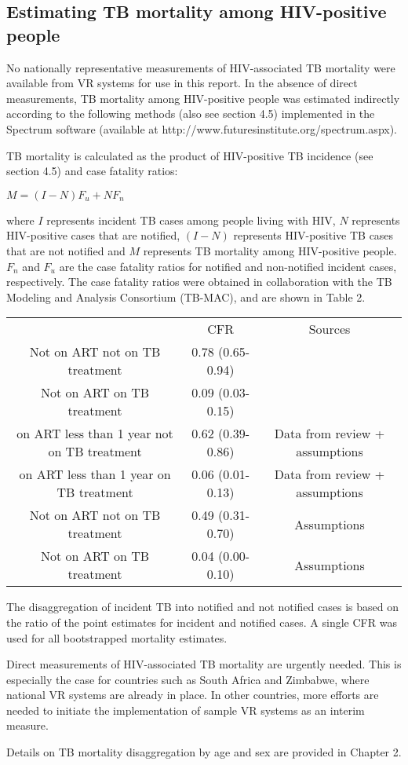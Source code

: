 \subsection{Estimating TB mortality among HIV-positive people}

No nationally representative measurements of HIV-associated TB mortality were available from VR systems for use in this report. In the absence of direct measurements, TB mortality among HIV-positive people was estimated indirectly according to the following methods (also see section 4.5) implemented in the Spectrum software (available at http://www.futuresinstitute.org/spectrum.aspx).

TB mortality is calculated as the product of HIV-positive TB incidence (see section 4.5) and case fatality ratios:

$M = (I-N)F_u + NF_n$ 									

where $I$ represents incident TB cases among people living with HIV, $N$ represents HIV-positive cases that are notified, $(I-N)$ represents HIV-positive TB cases that are not notified and $M$ represents TB mortality among HIV-positive people. $F_n$ and $F_u$ are the case fatality ratios for notified and non-notified incident cases, respectively. The case fatality ratios were obtained in collaboration with the TB Modeling and Analysis Consortium (TB-MAC), and are shown in Table 2.

\begin{table} 
    \begin{tabular}{ c c c }
         & CFR & Sources \\ 
        Not on ART not on TB treatment & 0.78 (0.65-0.94) &  \cite{12742798} \\ 
        Not on ART on TB treatment & 0.09 (0.03-0.15) & \cite{21738585} \cite{11216921}\\ 
        on ART less than 1 year not on TB treatment & 0.62 (0.39-0.86) & Data from review + assumptions \\ 
        on ART less than 1 year on TB treatment &  0.06 (0.01-0.13) & Data from review + assumptions \\ 
        Not on ART not on TB treatment & 0.49 (0.31-0.70) & Assumptions \\ 
        Not on ART on TB treatment & 0.04 (0.00-0.10) & Assumptions \\ 
    \end{tabular} 
\end{table}

The disaggregation of incident TB into notified and not notified cases is based on the ratio of the point estimates for incident and notified cases. A single CFR was used for all bootstrapped mortality estimates.

Direct measurements of HIV-associated TB mortality are urgently needed. This is especially the case for countries such as South Africa and Zimbabwe, where national VR systems are already in place. In other countries, more efforts are needed to initiate the implementation of sample VR systems as an interim measure.

Details on TB mortality disaggregation by age and sex are provided in Chapter 2.



